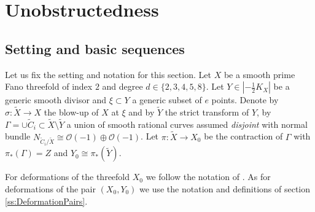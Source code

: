 \documentclass[10pt,a4paper]{amsart}
\newcommand{\abs}[1]{\left\vert#1\right\vert}
\newcommand{\OO}{\mathcal{O}}
\begin{document}
\section{Unobstructedness}\label{s:Un}
\subsection{Setting and basic sequences}\label{ss:setting}
Let us fix the setting and notation for this section. Let $X$ be a smooth prime Fano threefold of index $2$ and degree $d\in \{2,3,4,5,8\}$.
Let $Y\in \abs{-\frac{1}{2} K_X}$ be a generic smooth divisor and $\xi\subset Y$ a generic subset of $e$ points.
Denote by $\sigma:\tilde{X}\to X$ the blow-up of $X$ at $\xi$ and by $\tilde{Y}$ the strict transform of $Y$, by $\Gamma=\cup \tilde{C}_i\subset \tilde X\setminus \tilde Y$ a union of smooth rational curves assumed \emph{disjoint} with normal bundle $N_{\tilde C_i/\tilde X}\cong \OO(-1)\oplus \OO(-1)$.
Let $\pi:\tilde{X}\to X_0$ be the contraction of $\Gamma$ with $\pi_*(\Gamma)=Z$ and $Y_0\cong \pi_*(\tilde Y)$.

For deformations of the threefold $X_0$ we follow the notation of \cite{F86}. 
As for deformations of the pair $(X_0,Y_0)$ we use the notation and definitions of section \ref{ss:DeformationPairs}. 
\end{document}
